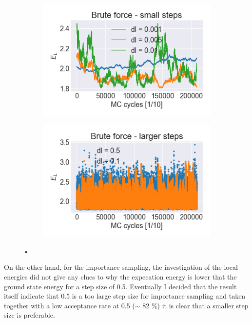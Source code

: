 \begin{figure}[H]
\begin{subfigure}{.5\textwidth}
\includegraphics[width=\linewidth]{../Results/brute_force_small_steps}\caption{}\label{fig:brute_force_small_steps}
\end{subfigure}
\begin{subfigure}{.5\textwidth}
\includegraphics[width=\linewidth]{../Results/brute_force_larger_steps}\caption{}\label{fig:brute_force_larger_steps}
\end{subfigure}
\caption{•}\label{fig:brute_force_step_sizes}
\end{figure}

On the other hand, for the importance sampling, the investigation of the local energies did not give any clues to why the expecation energy is lower that the ground state energy for a step size of 0.5. Eventually I decided that the result itself indicate that 0.5 is a too large step size for importance sampling and taken together with a low acceptance rate at 0.5 ($\sim$ 82 \%) it is clear that a smaller step size is preferable. 


